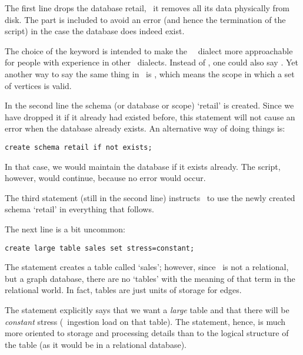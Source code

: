 The first line drops the database retail,
\ie\ it removes all its data physically
from disk. The  part
is included to avoid an error 
(and hence the termination of the script)
in the case
the database does indeed exist.

The choice of the keyword  is intended to 
make the \nowdb\ \sql\ dialect more
approachable for people with experience
in other \sql\ dialects. Instead of
, one could also say
. 
Yet another way to say the same thing
in \nowdb\ is , which
means the scope in which a set of
vertices is valid.

In the second line the schema
(or database or scope) `retail'
is created. Since we have dropped it
if it already had existed before,
this statement will not cause
an error when the database already exists.
An alternative way of doing things is:

\begin{sqlcode}
\begin{lstlisting}
create schema retail if not exists;
\end{lstlisting}
\end{sqlcode}

In that case, we would maintain the database
if it exists already. The script, however,
would continue, because no error would occur.

The third statement (still in the second line)
instructs \nowdb\ to use the newly created
schema `retail' in everything that follows.

The next line is a bit uncommon:

\begin{sqlcode}
\begin{lstlisting}
create large table sales set stress=constant;
\end{lstlisting}
\end{sqlcode}

The statement creates a table called `sales';
however, since \nowdb\ is not a relational,
but a graph database, there are no 
`tables' with the meaning of that term
in the relational world.
In fact, tables are just units of storage 
for edges. 

The statement explicitly says that we
want a \emph{large} table and that there
will be \emph{constant} stress (\ie\ ingestion load
on that table). The  statement,
hence, is much more oriented to storage
and processing details than to the logical structure
of the table (as it would be in a relational database).

